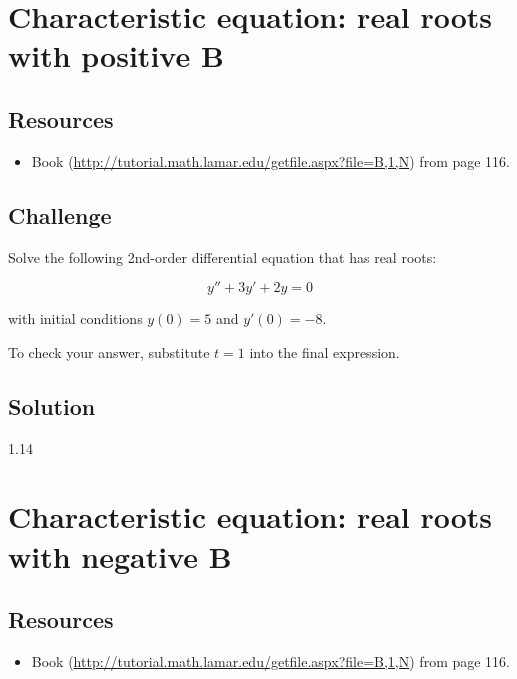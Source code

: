 \timebox




\newpage
\section{Characteristic equation: real roots with positive B}

\subsection*{Resources}
\begin{itemize}
    \item Book (\url{http://tutorial.math.lamar.edu/getfile.aspx?file=B,1,N}) from page 116.
\end{itemize}

\subsection*{Challenge}
Solve the following 2nd-order differential equation that has real roots:

\begin{equation}
    \label{eq:ccrrpb}
    y'' + 3 y' + 2 y = 0
\end{equation}

with initial conditions $y(0)=5$ and $y'(0)=-8$.

To check your answer, substitute $t=1$ into the final expression.


\subsection*{Solution}
1.14 %




\newpage
\section{Characteristic equation: real roots with negative B}

\subsection*{Resources}
\begin{itemize}
    \item Book (\url{http://tutorial.math.lamar.edu/getfile.aspx?file=B,1,N}) from page 116.
\end{itemize}

